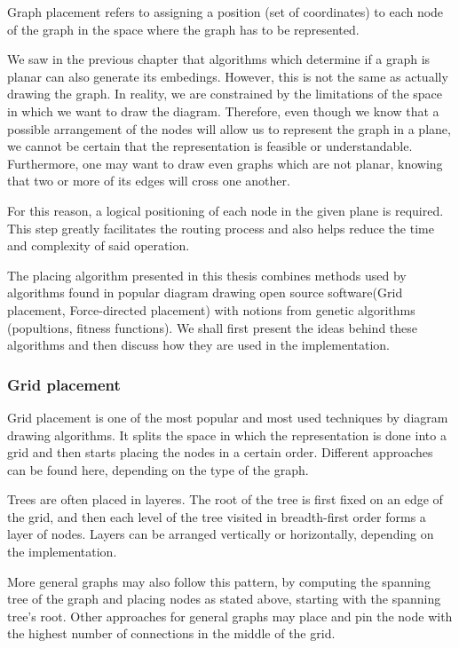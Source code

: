 Graph placement refers to assigning a position (set of coordinates) to each node of the graph in the space where 
the graph has to be represented.

We saw in the previous chapter that algorithms which determine if a graph is planar can also generate its 
embedings. However, this is not the same as actually drawing the graph. In reality, we are constrained by the 
limitations of the space in which we want to draw the diagram. Therefore, even though we know that a possible 
arrangement of the nodes will allow us to represent the graph in a plane, we cannot be certain that the 
representation is feasible or understandable. Furthermore, one may want to draw even graphs which are not planar, 
knowing that two or more of its edges will cross one another.

For this reason, a logical positioning of each node in the given plane is required. This step greatly facilitates 
the routing process and also helps reduce the time and complexity of said operation.

The placing algorithm presented in this thesis combines methods used by algorithms found in popular diagram drawing open 
source software(Grid placement, Force-directed placement) with notions from genetic algorithms (popultions, fitness functions).
We shall first present the ideas behind these algorithms and then discuss how they are used in the implementation.

\subsubsection{Grid placement}

Grid placement is one of the most popular and most used techniques by diagram drawing algorithms. It splits the space in 
which the representation is done into a grid and then starts placing the nodes in a certain order. Different approaches 
can be found here, depending on the type of the graph. 

Trees are often placed in layeres. The root of the tree is first fixed on an edge of the grid, and then each level of the tree 
visited in breadth-first order forms a layer of nodes. Layers can be arranged vertically or horizontally, depending on the implementation.

More general graphs may also follow this pattern, by computing the spanning tree of the graph and placing nodes as stated above, 
starting with the spanning tree's root. Other approaches for general graphs may place and pin the node with the highest number of 
connections in the middle of the grid.

